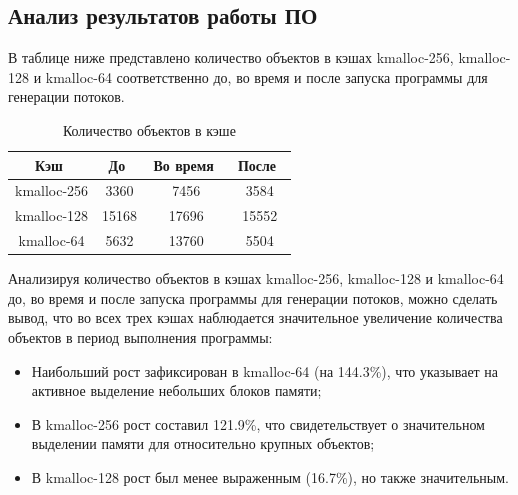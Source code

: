 \newpage

\subsection{Анализ результатов работы ПО}

В таблице ниже представлено количество объектов в кэшах kmalloc-256, kmalloc-128 и kmalloc-64 соответственно до, во время и после запуска программы для генерации потоков.

\begin{table}[H]
    \centering
    \caption{Количество объектов в кэше}
    \label{tab:table}
    \begin{tabular}{|c|c|c|c|}
        \hline
        \,\hfill \textbf{Кэш} \hfill\, & \,\hfill \textbf{До} \hfill\, & \,\hfill \textbf{Во время} \hfill\, & \,\hfill \textbf{После} \hfill\, \\ \hline
        kmalloc-256 &  3360 &  7456 &  3584 \\ \hline
        kmalloc-128 & 15168 & 17696 & 15552 \\ \hline
        kmalloc-64  &  5632 & 13760 &  5504 \\ \hline
    \end{tabular}
\end{table}

Анализируя количество объектов в кэшах kmalloc-256, kmalloc-128 и kmalloc-64 до, во время и после запуска программы для генерации потоков, можно сделать вывод, что во всех трех кэшах наблюдается значительное увеличение количества объектов в период выполнения программы:
\begin{itemize}
    \item Наибольший рост зафиксирован в kmalloc-64 (на 144.3\%), что указывает на активное выделение небольших блоков памяти;
    \item В kmalloc-256 рост составил 121.9\%, что свидетельствует о значительном выделении памяти для относительно крупных объектов;
    \item В kmalloc-128 рост был менее выраженным (16.7\%), но также значительным.
\end{itemize}

